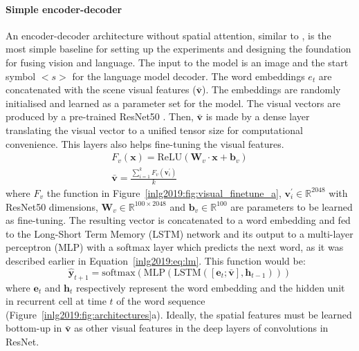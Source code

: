 \paragraph{Simple encoder-decoder} An encoder-decoder architecture without spatial attention, similar to \cite{vinyals2015show}, is the most simple baseline for setting up the experiments and designing the foundation for fusing vision and language. 
The input to the model is an image and the start symbol $<s>$ for the language model decoder. 
The word embeddings $e_t$ are concatenated with the scene visual features ($\bar{\bm{v}}$).
The embeddings are randomly initialised and learned as a parameter set for the model.
The visual vectors are produced by a pre-trained ResNet50 \cite{he2016deep}.
Then, $\bar{\bm{v}}$ is made by a dense layer translating the visual vector to a unified tensor size for computational convenience.
This layers also helps fine-tuning the visual features. 
\begin{align*}
F_v(\bm{x}) = \mathrm{ReLU}(\bm{W}_v \cdot \bm{x} + \bm{b}_v) \\
\bar{\bm{v}} = \frac{\sum_{i=1}^{k}{F_v(\bm{v}^{\prime}_i)}}{k}
\end{align*}
\noindent where $F_v$ the function in Figure~\ref{inlg2019:fig:visual_finetune_a}, $\bm{v}^{\prime}_i \in \mathbb{R}^{2048}$ with ResNet50 dimensions, $\bm{W}_v \in \mathbb{R}^{100 \times 2048}$ and  $\bm{b}_v \in \mathbb{R}^{100}$ are parameters to be learned as fine-tuning.
The resulting vector is concatenated to a word embedding and fed to the Long-Short Term Memory (LSTM) network \cite{hochreiter1997long} and its output to a multi-layer perceptron (MLP) with a softmax layer which predicts the next word, as it was described earlier in Equation~\ref{inlg2019:eq:lm}. This function would be:
\begin{equation}
\hat{\bm{y}}_{t+1} = \textrm{softmax}(\mathrm{MLP}(\mathrm{LSTM}([\bm{e}_{t};\bar{\bm{v}}], \bm{h}_{t-1})))
\end{equation}
\noindent where $\bm{e}_{t}$ and $\bm{h}_{t}$ respectively represent the word embedding and the hidden unit in recurrent cell at time $t$ of the word sequence (Figure~\ref{inlg2019:fig:architectures}a). Ideally, the spatial features must be learned bottom-up in $\bar{\bm{v}}$ as other visual features in the deep layers of convolutions in ResNet.


